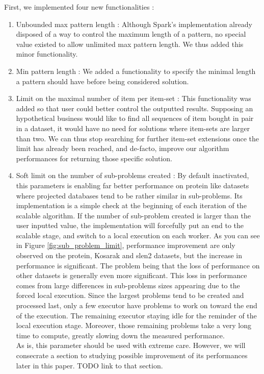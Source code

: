 \documentclass{eplmastersthesis}
\begin{document}
First, we implemented four new functionalities :
\begin{enumerate}
	\item Unbounded max pattern length : Although Spark's implementation already disposed of a way to control the maximum length of a pattern, no special value existed to allow unlimited max pattern length. We thus added this minor functionality.
	\item Min pattern length : We added a functionality to specify the minimal length a pattern should have before being considered solution.
	\item Limit on the maximal number of item per item-set : This functionality was added so that user could better control the outputted results. Supposing an hypothetical business would like to find all sequences of item bought in pair in a dataset, it would have no need for solutions where item-sets are larger than two. We can thus stop searching for further item-set extensions once the limit has already been reached, and de-facto, improve our algorithm performances for returning those specific solution.
	\item Soft limit on the number of sub-problems created : By default inactivated, this parameters is enabling far better performance on protein like datasets where projected databases tend to be rather similar in sub-problems. Its implementation is a simple check at the beginning of each iteration of the scalable algorithm. If the number of sub-problem created is larger than the user inputted value, the implementation will forcefully put an end to the scalable stage, and switch to a local execution on each worker.\newline
	 As you can see in Figure \ref{fig:sub_problem_limit}, performance improvement are only observed on the protein, Kosarak and slen2 datasets, but the increase in performance is significant. The problem being that the loss of performance on other datasets is generally even more significant. This loss in performance comes from large differences in sub-problems sizes appearing due to the forced local execution. Since the largest problems tend to be created and processed last, only a few executor have problems to work on toward the end of the execution. The remaining executor staying idle for the reminder of the local execution stage. Moreover, those remaining problems take a very long time to compute, greatly slowing down the measured performance. \\
	 As is, this parameter should be used with extreme care. However, we will consecrate a section to studying possible improvement of its performances later in this paper. TODO link to that section.
\end{enumerate}
\end{document}
